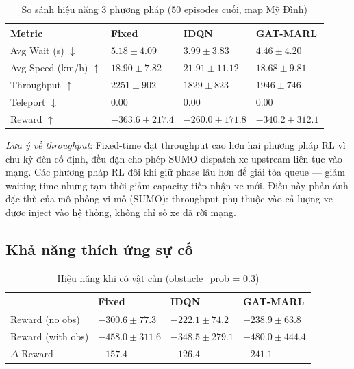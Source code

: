 \documentclass[conference]{IEEEtran}
\begin{document}
\begin{table}[h]
\centering
\caption{So sánh hiệu năng 3 phương pháp (50 episodes cuối, map Mỹ Đình)}
\label{tab:results}
\setlength{\tabcolsep}{4pt}
\begin{tabular}{lp{1.6cm}p{1.6cm}p{1.6cm}}
\toprule
\textbf{Metric} & \textbf{Fixed} & \textbf{IDQN} & \textbf{GAT-MARL} \\
\midrule
Avg Wait (s) $\downarrow$      & $5.18 \pm 4.09$  & $3.99 \pm 3.83$   & $4.46 \pm 4.20$ \\
Avg Speed (km/h) $\uparrow$    & $18.90 \pm 7.82$ & $21.91 \pm 11.12$ & $18.68 \pm 9.81$ \\
Throughput $\uparrow$          & $2251 \pm 902$   & $1829 \pm 823$    & $1946 \pm 746$ \\
Teleport $\downarrow$          & $0.00$           & $0.00$            & $0.00$ \\
Reward $\uparrow$              & $-363.6 \pm 217.4$  & $-260.0 \pm 171.8$   & $-340.2 \pm 312.1$ \\
\bottomrule
\end{tabular}
\end{table}

\textit{Lưu ý về throughput}: Fixed-time đạt throughput cao hơn hai phương pháp RL vì chu kỳ đèn cố định, đều đặn cho phép SUMO dispatch xe upstream liên tục vào mạng. Các phương pháp RL đôi khi giữ phase lâu hơn để giải tỏa queue --- giảm waiting time nhưng tạm thời giảm capacity tiếp nhận xe mới. Điều này phản ánh đặc thù của mô phỏng vi mô (SUMO): throughput phụ thuộc vào cả lượng xe được inject vào hệ thống, không chỉ số xe đã rời mạng.

\subsection{Khả năng thích ứng sự cố}

\begin{table}[h]
\centering
\caption{Hiệu năng khi có vật cản (obstacle\_prob = 0.3)}
\label{tab:obstacle}
\setlength{\tabcolsep}{4pt}
\begin{tabular}{lp{1.5cm}p{1.5cm}p{1.6cm}}
\toprule
& \textbf{Fixed} & \textbf{IDQN} & \textbf{GAT-MARL} \\
\midrule
Reward (no obs)   & $-300.6 \pm 77.3$  & $-222.1 \pm 74.2$  & $-238.9 \pm 63.8$ \\
Reward (with obs) & $-458.0 \pm 311.6$ & $-348.5 \pm 279.1$ & $-480.0 \pm 444.4$ \\
$\Delta$ Reward   & $-157.4$           & $-126.4$           & $-241.1$ \\
\bottomrule
\end{tabular}
\end{table}
\end{document}
